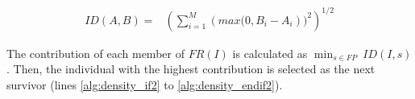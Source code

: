 \begin{equation} \label{eq:ImprovementDistance}
\begin{split}
 ID(A, B) = &  \left (\sum_{i=1}^M \left (max(0, B_i - A_i \right ))^2  \right)^{1/2}
\end{split}
\end{equation}

The contribution of each member of $FR (I)$ is calculated as $\displaystyle{\min_{s \in FP}\ ID(I, s)}$.
%
Then, the individual with the highest contribution is selected as the next survivor (lines \ref{alg:density_if2} to \ref{alg:density_endif2}).%

